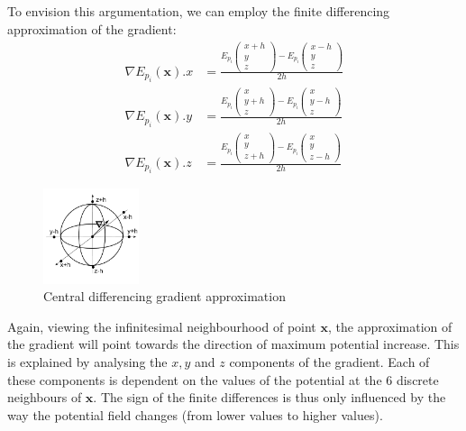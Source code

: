 \documentclass[12pt]{article}
\begin{document}
To envision this argumentation, we can employ the finite differencing approximation of the gradient:
\begin{align}
\nabla E_{p_i}(\mathbf{x}).x & = \frac{E_{p_i} \left( 
\begin{array}{c}
x + h \\
y \\
z
\end{array}
\right) - E_{p_i} \left(
\begin{array}{c}
x - h \\
y\\
z
\end{array}
\right) } {2h} \\
\nabla E_{p_i}(\mathbf{x}).y & = \frac{E_{p_i} \left( 
\begin{array}{c}
x \\
y + h \\
z
\end{array}
\right) - E_{p_i} \left(
\begin{array}{c}
x \\
y - h\\
z
\end{array}
\right) } {2h} \\
\nabla E_{p_i}(\mathbf{x}).z & = \frac{E_{p_i} \left( 
\begin{array}{c}
x \\
y \\
z + h
\end{array}
\right) - E_{p_i} \left(
\begin{array}{c}
x \\
y \\
z -h
\end{array}
\right) } {2h}
\end{align}

\begin{figure}[h!]
\caption{Central differencing gradient approximation}
\centering
\includegraphics[width=0.25\textwidth]{"figs/central_differencing"}
\end{figure}

Again, viewing the infinitesimal neighbourhood of point $\mathbf{x}$, the approximation of the gradient will point towards the direction of maximum potential
increase. This is explained by analysing the $x,y$ and $z$ components of the gradient. Each of these components is dependent on the values of the potential at the 6 discrete
neighbours of $\mathbf{x}$. The sign of the finite differences is thus only influenced by the way the potential field changes (from lower values to higher values).
\end{document}
